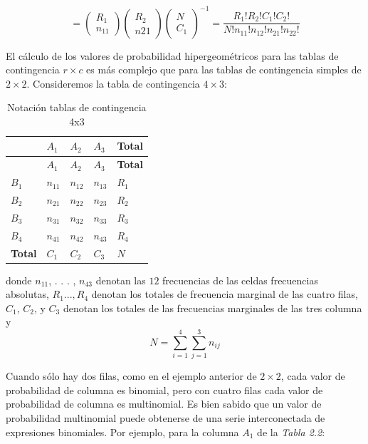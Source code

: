 \documentclass[12pt,a4paper,]{book}
\numberwithin{dummy}{section}
\theoremstyle{ocrenumbox}
\theoremstyle{blacknumex}
\theoremstyle{blacknumbox}
\theoremstyle{ocrenum}
\theoremstyle{ocrenum}
\begin{document}
\[
=\left(\begin{array}{c}R_1\\ n_{11}\end{array}\right)\left(\begin{array}{c}R_2\\ n{21}\end{array}\right)\left(\begin{array}{c}N\\ C_1\end{array}\right)^{-1}=\frac{R_1!R_2!C_1!C_2!}{N!n_{11}!n_{12}!n_{21}!n_{22}!}
\]

El cálculo de los valores de probabilidad hipergeométricos para las
tablas de contingencia \(r\times c\) es más complejo que para las tablas
de contingencia simples de \(2\times2\). Consideremos la tabla de
contingencia \(4\times3\):

\begin{longtable}[]{@{}lllll@{}}
\caption{Notación tablas de contingencia 4x3}\tabularnewline
\toprule
& \(A_1\) & \(A_2\) & \(A_3\) & \textbf{Total} \\
\midrule
\endfirsthead
\toprule
& \(A_1\) & \(A_2\) & \(A_3\) & \textbf{Total} \\
\midrule
\endhead
\(B_1\) & \(n_{11}\) & \(n_{12}\) & \(n_{13}\) & \(R_1\) \\
\(B_2\) & \(n_{21}\) & \(n_{22}\) & \(n_{23}\) & \(R_2\) \\
\(B_3\) & \(n_{31}\) & \(n_{32}\) & \(n_{33}\) & \(R_3\) \\
\(B_4\) & \(n_{41}\) & \(n_{42}\) & \(n_{43}\) & \(R_4\) \\
\textbf{Total} & \(C_1\) & \(C_2\) & \(C_3\) & \(N\) \\
\bottomrule
\end{longtable}

donde \(n_{11}\), . . . , \(n_{43}\) denotan las \(12\) frecuencias de
las celdas frecuencias absolutas, \(R_1 . . . , R_4\) denotan los
totales de frecuencia marginal de las cuatro filas, \(C_1\), \(C_2\), y
\(C_3\) denotan los totales de las frecuencias marginales de las tres
columna y\[
N=\sum_{i=1}^4\sum_{j=1}^3 n_{ij}   
\]

Cuando sólo hay dos filas, como en el ejemplo anterior de \(2\times2\),
cada valor de probabilidad de columna es binomial, pero con cuatro filas
cada valor de probabilidad de columna es multinomial. Es bien sabido que
un valor de probabilidad multinomial puede obtenerse de una serie
interconectada de expresiones binomiales. Por ejemplo, para la columna
\(A_1\) de la \emph{Tabla 2.2}:
\end{document}
